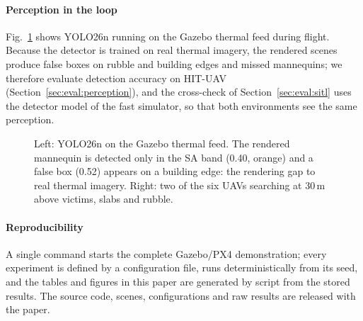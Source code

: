 \paragraph{Perception in the loop}
Fig.~\ref{fig:pipeline} shows YOLO26n running on the Gazebo thermal feed during flight. Because the
detector is trained on real thermal imagery, the rendered scenes produce false boxes on rubble and building edges
and missed mannequins; we therefore evaluate detection accuracy on HIT-UAV
(Section~\ref{sec:eval:perception}), and the cross-check of Section~\ref{sec:eval:sitl} uses the
detector model of the fast simulator, so that both environments see the same perception.
\begin{figure}[t]\centering
{}\hfill
{}
\caption{Left: YOLO26n on the Gazebo thermal feed. The rendered mannequin is detected only in the
SA band (0.40, orange) and a false box (0.52) appears on a building edge: the rendering gap to real
thermal imagery. Right: two of the six UAVs searching at
30\,m above victims, slabs and rubble.}\label{fig:pipeline}
\end{figure}

\paragraph{Reproducibility}
A single command starts the complete Gazebo/PX4 demonstration; every experiment is defined by a
configuration file, runs deterministically from its seed, and the tables and figures in this paper
are generated by script from the stored results. The source code, scenes, configurations and raw
results are released with the paper.
